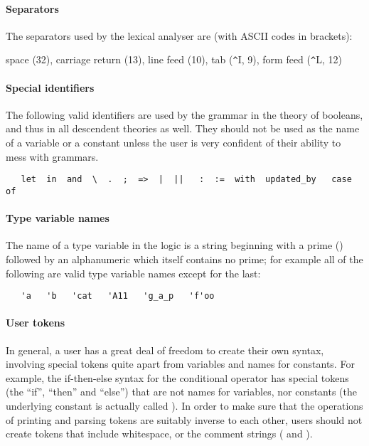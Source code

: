 

\paragraph{Separators}

The separators used by the \HOL{} lexical analyser are (with ASCII codes in
brackets):

\bigskip

space (32), carriage return (13), line feed (10), tab ({\verb+^+}I, 9),
form feed ({\verb+^+}L, 12)


\paragraph{Special identifiers}

The following valid identifiers are used by the grammar in the theory
of booleans, and thus in all descendent theories as well.  They should
not be used as the name of a variable or a constant unless the user is
very confident of their ability to mess with grammars.
%
\begin{verbatim}
   let  in  and  \  .  ;  =>  |  ||   :  :=  with  updated_by   case   of
\end{verbatim}

\paragraph {Type variable names}\label{tyvars}

The name of a type variable in the \HOL{} logic is a string
beginning with a prime () followed by an alphanumeric which itself
contains no prime; for example all of the following are valid type
variable names except for the last:
%
\begin{hol}
\begin{verbatim}
   'a   'b   'cat   'A11   'g_a_p   'f'oo
\end{verbatim}
\end{hol}

\paragraph{User tokens}
In general, a \HOL{} user has a great deal of freedom to create their own syntax, involving special tokens quite apart from variables and names for constants.
For example, the if-then-else syntax for the conditional operator %
%
has special tokens (the ``if'', ``then'' and ``else'') that are not names for variables, nor constants (the underlying constant is actually called ).
In order to make sure that the operations of printing and parsing tokens are suitably inverse to each other, users should not create tokens that include whitespace, or the comment strings (\ml{(*} and \ml{*)}).

